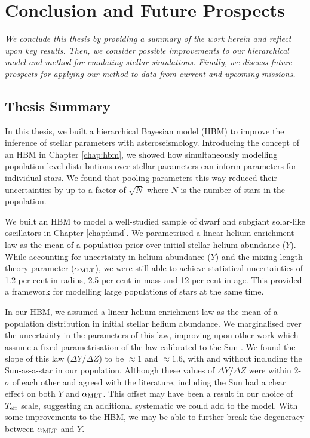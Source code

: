 %
%
%
%
%
\chapter{Conclusion and Future Prospects}

\textit{We conclude this thesis by providing a summary of the work herein and reflect upon key results. Then, we consider possible improvements to our hierarchical model and method for emulating stellar simulations. Finally, we discuss future prospects for applying our method to data from current and upcoming missions.}

\section{Thesis Summary}

In this thesis, we built a hierarchical Bayesian model (HBM) to improve the inference of stellar parameters with asteroseismology. Introducing the concept of an HBM in Chapter \ref{chap:hbm}, we showed how simultaneously modelling population-level distributions over stellar parameters can inform parameters for individual stars. We found that pooling parameters this way reduced their uncertainties by up to a factor of \(\sqrt{N}\) where \(N\) is the number of stars in the population.

We built an HBM to model a well-studied sample of dwarf and subgiant solar-like oscillators in Chapter \ref{chap:hmd}. We parametrised a linear helium enrichment law as the mean of a population prior over initial stellar helium abundance (\(Y\)). While accounting for uncertainty in helium abundance (\(Y\)) and the mixing-length theory parameter (\({\alpha_\mathrm{MLT}}\)), we were still able to achieve statistical uncertainties of 1.2 per cent in radius, 2.5 per cent in mass and 12 per cent in age. This provided a framework for modelling large populations of stars at the same time.

In our HBM, we assumed a linear helium enrichment law as the mean of a population distribution in initial stellar helium abundance. We marginalised over the uncertainty in the parameters of this law, improving upon other work which assume a fixed parametrisation of the law calibrated to the Sun \citep[e.g.][]{Serenelli.Johnson.ea2017}. We found the slope of this law (\(\Delta Y/\Delta Z\)) to be \(\approx 1\) and \(\approx 1.6\), with and without including the Sun-as-a-star in our population. Although these values of \(\Delta Y/\Delta Z\) were within 2-\(\sigma\) of each other and agreed with the literature, including the Sun had a clear effect on both \(Y\) and \({\alpha_\mathrm{MLT}}\). This offset may have been a result in our choice of \({T_\mathrm{eff}}\) scale, suggesting an additional systematic we could add to the model. With some improvements to the HBM, we may be able to further break the degeneracy between \({\alpha_\mathrm{MLT}}\) and \(Y\).

